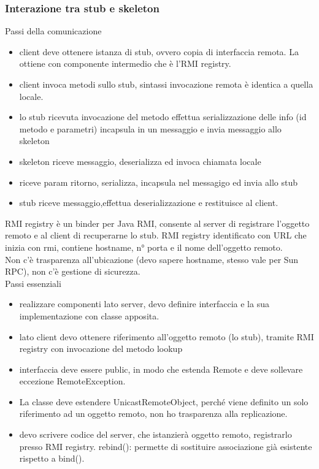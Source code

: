\documentclass[16px]{article}
\begin{document}
\subsubsection{Interazione tra stub e skeleton}
Passi della comunicazione
\begin{itemize}
\item client deve ottenere istanza di stub, ovvero copia di interfaccia remota. La ottiene con componente intermedio che è l'RMI registry.
\item client invoca metodi sullo stub, sintassi invocazione remota è identica a quella locale.
\item lo stub ricevuta invocazione del metodo effettua serializzazione delle info (id metodo e parametri) incapsula in un messaggio e invia messaggio allo skeleton
\item skeleton riceve messaggio, deserializza ed invoca chiamata locale
\item riceve param ritorno, serializza, incapsula nel messagigo ed invia allo stub
\item stub riceve messaggio,effettua deserializzazione e restituisce al client.
\end{itemize}
RMI registry è un binder per Java RMI, consente al server di registrare l'oggetto remoto e al client di recuperarne lo stub. RMI registry identificato con URL che inizia con rmi, contiene hostname, n° porta e il nome dell'oggetto remoto.\\ Non c'è trasparenza all'ubicazione (devo sapere hostname, stesso vale per Sun RPC), non c'è gestione di sicurezza.\\ Passi essenziali
\begin{itemize}
\item realizzare componenti lato server, devo definire interfaccia e la sua implementazione con classe apposita.
\item lato client devo ottenere riferimento all'oggetto remoto (lo stub), tramite RMI registry con invocazione del metodo lookup
\item interfaccia deve essere public, in modo che estenda Remote e deve sollevare eccezione RemoteException.
\item La classe deve estendere UnicastRemoteObject, perché viene definito un solo riferimento ad un oggetto remoto, non ho trasparenza alla replicazione.
\item devo scrivere codice del server, che istanzierà oggetto remoto, registrarlo presso RMI registry. rebind(): permette di sostituire associazione già esistente rispetto a bind().
\end{itemize}
\end{document}
